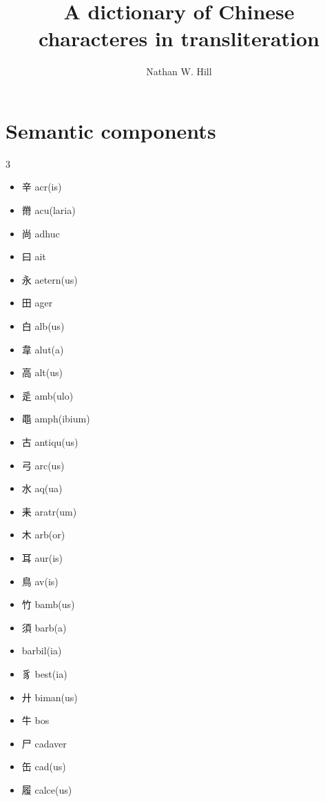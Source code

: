 \documentclass[xetex, svgnames, 12pt]{scrartcl}
\title{A dictionary of Chinese characteres in transliteration}
\author{Nathan W. Hill}
\begin{document}
\maketitle
\begin{abstract}
\noindent 
\end{abstract}


\section{Semantic components}
\begin{multicols}{3}
\begin{itemize}[noitemsep]
    \item 辛 acr(is)
    \item 黹 acu(laria)
    \item 尚 
    adhuc 
    \item 曰 ait
    \item 永 aetern(us)
    \item 田 ager 
    \item 白 alb(us) 
    \item 韋 alut(a)
    \item 高 alt(us) 
    \item 辵 amb(ulo)
    \item 黽 amph(ibium)
    \item 古 
    antiqu(us) 
    \item 弓 
    arc(us) 
    \item 水 aq(ua) 
    \item 耒 
    aratr(um) 
    \item 木 arb(or) 
    \item 耳 aur(is) 
    \item 鳥 av(is)
    \item 竹 bamb(us)
    \item 須 barb(a)
    \item {}
barbil(ia)
    \item 豸 best(ia) 
    \item 廾 biman(us)
    \item 牛 bos 
    \item 尸 cadaver
    \item 缶 cad(us)
    \item 履 calce(us)

\end{itemize}
\end{multicols}
\end{document}
